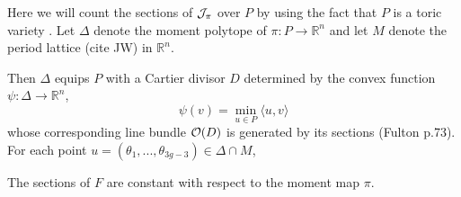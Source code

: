 	Here we will count the sections of $\mathcal{J}_\pi$ over $P$ by using the fact that $P$ is a toric variety \cite[Thm 3.13]{hurtubise_representations_2000}. Let $\Delta$ denote the moment polytope of $\pi:P\to\mathbb{R}^n$ and let $M$ denote the period lattice (cite JW) in $\mathbb{R}^n$. 
	
	Then $\Delta$ equips $P$ with a Cartier divisor $D$ determined by the convex function $\psi:\Delta \to \mathbb{R}^n$,
	\begin{equation}
		\psi(v) = \min_{u\in P}\langle u,v\rangle
	\end{equation}
	whose corresponding line bundle $\mathcal{O}(D)$ is generated by its sections (Fulton p.73). For each point $u = (\theta_1,...,\theta_{3g-3})\in \Delta \cap M$, 
	\begin{lemma}
		The sections of $F$ are constant with respect to the moment map $\pi$.
	\end{lemma} 
	
	
	
		
	